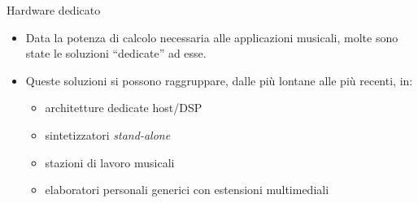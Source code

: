 %
%
%
%
%
\setcounter{ms}{1}
\begin{slide}{Hardware dedicato}
{

	\begin{itemize}
	\setlength{\itemsep}{8mm}

		\item Data la potenza di calcolo necessaria
              alle applicazioni musicali,
              molte sono state le soluzioni ``dedicate'' ad esse.

		\item Queste soluzioni si possono raggruppare,
              dalle pi\`u lontane alle pi\`u recenti, in:

			  \begin{itemize}
			  \setlength{\itemsep}{4mm}

			  	\item architetture dedicate host/DSP

				\item sintetizzatori \emph{stand-alone}

				\item stazioni di lavoro musicali

				\item elaboratori personali generici
				      con estensioni multimediali

			  \end{itemize}

	\end{itemize}
}
\end{slide}

